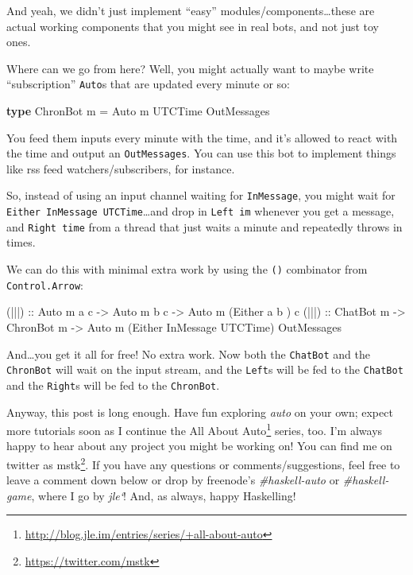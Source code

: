 \documentclass[]{article}
\newenvironment{Shaded}{}{}
\newcommand{\KeywordTok}[1]{\textcolor[rgb]{0.00,0.44,0.13}{\textbf{{#1}}}}
\newcommand{\DataTypeTok}[1]{\textcolor[rgb]{0.56,0.13,0.00}{{#1}}}
\newcommand{\OtherTok}[1]{\textcolor[rgb]{0.00,0.44,0.13}{{#1}}}
\newcommand{\FunctionTok}[1]{\textcolor[rgb]{0.02,0.16,0.49}{{#1}}}
\newcommand{\NormalTok}[1]{{#1}}
\renewcommand{\href}[2]{#2\footnote{\url{#1}}}
\begin{document}
And yeah, we didn't just implement ``easy''
modules/components\ldots{}these are actual working components that you
might see in real bots, and not just toy ones.

Where can we go from here? Well, you might actually want to maybe write
``subscription'' \texttt{Auto}s that are updated every minute or so:

\begin{Shaded}
\begin{Highlighting}[]
\KeywordTok{type} \DataTypeTok{ChronBot} \NormalTok{m }\FunctionTok{=} \DataTypeTok{Auto} \NormalTok{m }\DataTypeTok{UTCTime} \DataTypeTok{OutMessages}
\end{Highlighting}
\end{Shaded}

You feed them inputs every minute with the time, and it's allowed to
react with the time and output an \texttt{OutMessages}. You can use this
bot to implement things like rss feed watchers/subscribers, for
instance.

So, instead of using an input channel waiting for \texttt{InMessage},
you might wait for \texttt{Either\ InMessage\ UTCTime}\ldots{}and drop
in \texttt{Left\ im} whenever you get a message, and
\texttt{Right\ time} from a thread that just waits a minute and
repeatedly throws in times.

We can do this with minimal extra work by using the
\texttt{(\textbar{}\textbar{}\textbar{})} combinator from
\texttt{Control.Arrow}:

\begin{Shaded}
\begin{Highlighting}[]
\OtherTok{(|||) ::} \DataTypeTok{Auto} \NormalTok{m a c }\OtherTok{->} \DataTypeTok{Auto} \NormalTok{m b c }\OtherTok{->} \DataTypeTok{Auto} \NormalTok{m (}\DataTypeTok{Either} \NormalTok{a         b      ) c}
\OtherTok{(|||) ::} \DataTypeTok{ChatBot} \NormalTok{m  }\OtherTok{->} \DataTypeTok{ChronBot} \NormalTok{m }\OtherTok{->} \DataTypeTok{Auto} \NormalTok{m (}\DataTypeTok{Either} \DataTypeTok{InMessage} \DataTypeTok{UTCTime}\NormalTok{) }\DataTypeTok{OutMessages}
\end{Highlighting}
\end{Shaded}

And\ldots{}you get it all for free! No extra work. Now both the
\texttt{ChatBot} and the \texttt{ChronBot} will wait on the input
stream, and the \texttt{Left}s will be fed to the \texttt{ChatBot} and
the \texttt{Right}s will be fed to the \texttt{ChronBot}.

Anyway, this post is long enough. Have fun exploring \emph{auto} on your
own; expect more tutorials soon as I continue the
\href{http://blog.jle.im/entries/series/+all-about-auto}{All About Auto}
series, too. I'm always happy to hear about any project you might be
working on! You can find me on twitter as
\href{https://twitter.com/mstk}{mstk}. If you have any questions or
comments/suggestions, feel free to leave a comment down below or drop by
freenode's \emph{\#haskell-auto} or \emph{\#haskell-game}, where I go by
\emph{jle`}! And, as always, happy Haskelling!
\end{document}
